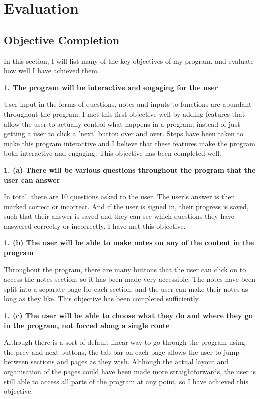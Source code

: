 \documentclass[12pt]{article}
\begin{document}
\clearpage

\section{Evaluation}


\subsection{Objective Completion}

In this section, I will list many of the key objectives of my program, and evaluate how well I have achieved them.

\textbf{1. The program will be interactive and engaging for the user}

User input in the forms of questions, notes and inputs to functions are abundant throughout the program. I met this first objective well by adding features that allow the user to actually control what happens in a program, instead of just getting a user to click a 'next' button over and over. Steps have been taken to make this program interactive and I believe that these features make the program both interactive and engaging. This objective has been completed well.

\textbf{1. (a) There will be various questions throughout the program that the user can answer}

In total, there are 10 questions asked to the user. The user's answer is then marked correct or incorrect. And if the user is signed in, their progress is saved, such that their answer is saved and they can see which questions they have answered correctly or incorrectly. I have met this objective.


\textbf{1. (b) The user will be able to make notes on any of the content in the program}

Throughout the program, there are many buttons that the user can click on to access the notes section, so it has been made very accessible. The notes have been split into a separate page for each section, and the user can make their notes as long as they like. This objective has been completed sufficiently.


\textbf{1. (c) The user will be able to choose what they do and where they go in the program, not forced along a single route}

Although there is a sort of default linear way to go through the program using the prev and next buttons, the tab bar on each page allows the user to jump between sections and pages as they wish. Although the actual layout and organisation of the pages could have been made more straightforwards, the user is still able to access all parts of the program at any point, so I have achieved this objective.
\end{document}

